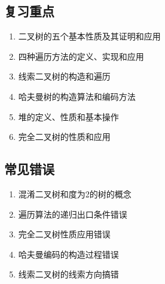 \documentclass[12pt,a4paper]{amsart}
\begin{document}
\subsection{复习重点}

\begin{enumerate}
\item 二叉树的五个基本性质及其证明和应用
\item 四种遍历方法的定义、实现和应用
\item 线索二叉树的构造和遍历
\item 哈夫曼树的构造算法和编码方法
\item 堆的定义、性质和基本操作
\item 完全二叉树的性质和应用
\end{enumerate}

\subsection{常见错误}

\begin{enumerate}
\item 混淆二叉树和度为2的树的概念
\item 遍历算法的递归出口条件错误
\item 完全二叉树性质应用错误
\item 哈夫曼编码的构造过程错误
\item 线索二叉树的线索方向搞错
\end{enumerate}
\end{document}
